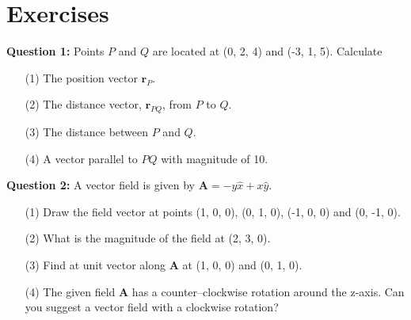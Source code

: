 \documentclass[12pt,a4paper]{article}
\begin{document}
\section{Exercises}
\noindent\textbf{Question 1:} Points $P$ and $Q$ are located at (0, 2, 4) and (-3, 1, 5). Calculate
\begin{enumerate}
\item[(1)] The position vector $\textbf{r}_P$.
\item[(2)] The distance vector, $\textbf{r}_{PQ}$, from $P$ to $Q$.
\item[(3)] The distance between $P$ and $Q$.
\item[(4)] A vector parallel to $PQ$ with magnitude of 10.
\end{enumerate}
\noindent\textbf{Question 2:} A vector field is given by $\textbf{A}=-y\hat x+x\hat y$.
\begin{enumerate}
\item[(1)] Draw the field vector at points (1, 0, 0), (0, 1, 0), (-1, 0, 0) and (0, -1, 0).
\item[(2)] What is the magnitude of the field at (2, 3, 0).
\item[(3)] Find at unit vector along \textbf{A} at (1, 0, 0) and (0, 1, 0).
\item[(4)] The given field \textbf{A} has a counter--clockwise rotation around the z-axis. Can you suggest a vector field with a clockwise rotation?
\end{enumerate}


\end{document}
